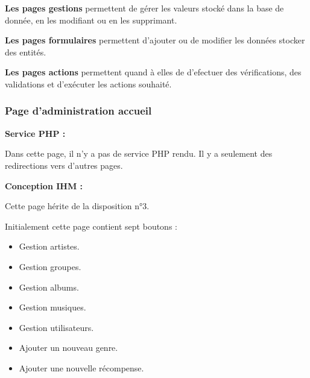         \begin{paragraphe}
            \textbf{Les pages gestions} permettent de gérer les valeurs stocké dans la base de donnée, en les modifiant ou en les supprimant.
        \end{paragraphe}
        
        \begin{paragraphe}
            \textbf{Les pages formulaires} permettent d'ajouter ou de modifier les données stocker des entités.
        \end{paragraphe}
        
        \begin{paragraphe}
            \textbf{Les pages actions} permettent quand à elles de d'efectuer des vérifications, des validations et d'exécuter les actions souhaité.

		\subsubsection{Page d'administration accueil}

			\begin{paragraphe}
				\textbf{Service PHP :}
			\end{paragraphe}

			\begin{paragraphe}
				Dans cette page, il n'y a pas de service PHP rendu. Il y a seulement des redirections vers d'autres pages.
			\end{paragraphe}

			\begin{paragraphe}
				\textbf{Conception IHM :}
			\end{paragraphe}

			\begin{paragraphe}
				Cette page hérite de la disposition n°3. \par
				Initialement cette page contient sept boutons :
				\begin{itemize}
					\item Gestion artistes.
					\item Gestion groupes.
					\item Gestion albums.
					\item Gestion musiques.
					\item Gestion utilisateurs.
					\item Ajouter un nouveau genre.
					\item Ajouter une nouvelle récompense.
				\end{itemize}
			\end{paragraphe}


\end{paragraphe}
